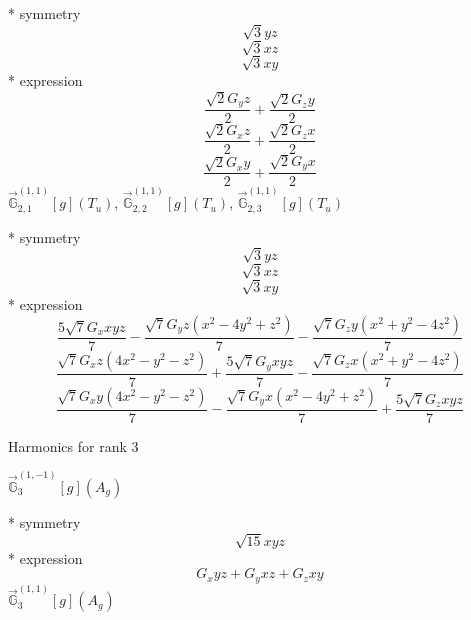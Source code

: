 \documentclass[fleqn,8pt]{jsarticle}
\begin{document}
\noindent\quad ** symmetry
\begin{dmath*}
\sqrt{3} y z
\end{dmath*}
\begin{dmath*}
\sqrt{3} x z
\end{dmath*}
\begin{dmath*}
\sqrt{3} x y
\end{dmath*}
\noindent\quad ** expression
\begin{dmath*}
\frac{\sqrt{2} G_{y} z}{2} + \frac{\sqrt{2} G_{z} y}{2}
\end{dmath*}
\begin{dmath*}
\frac{\sqrt{2} G_{x} z}{2} + \frac{\sqrt{2} G_{z} x}{2}
\end{dmath*}
\begin{dmath*}
\frac{\sqrt{2} G_{x} y}{2} + \frac{\sqrt{2} G_{y} x}{2}
\end{dmath*}
\noindent\quad $\vec{\mathbb{G}}_{2,1}^{(1,1)}[g](T_{u})$, $\vec{\mathbb{G}}_{2,2}^{(1,1)}[g](T_{u})$, $\vec{\mathbb{G}}_{2,3}^{(1,1)}[g](T_{u})$

\noindent\quad ** symmetry
\begin{dmath*}
\sqrt{3} y z
\end{dmath*}
\begin{dmath*}
\sqrt{3} x z
\end{dmath*}
\begin{dmath*}
\sqrt{3} x y
\end{dmath*}
\noindent\quad ** expression
\begin{dmath*}
\frac{5 \sqrt{7} G_{x} x y z}{7} - \frac{\sqrt{7} G_{y} z \left(x^{2} - 4 y^{2} + z^{2}\right)}{7} - \frac{\sqrt{7} G_{z} y \left(x^{2} + y^{2} - 4 z^{2}\right)}{7}
\end{dmath*}
\begin{dmath*}
\frac{\sqrt{7} G_{x} z \left(4 x^{2} - y^{2} - z^{2}\right)}{7} + \frac{5 \sqrt{7} G_{y} x y z}{7} - \frac{\sqrt{7} G_{z} x \left(x^{2} + y^{2} - 4 z^{2}\right)}{7}
\end{dmath*}
\begin{dmath*}
\frac{\sqrt{7} G_{x} y \left(4 x^{2} - y^{2} - z^{2}\right)}{7} - \frac{\sqrt{7} G_{y} x \left(x^{2} - 4 y^{2} + z^{2}\right)}{7} + \frac{5 \sqrt{7} G_{z} x y z}{7}
\end{dmath*}

\noindent * Harmonics for rank 3

\noindent\quad $\vec{\mathbb{G}}_{3}^{(1,-1)}[g](A_{g})$

\noindent\quad ** symmetry
\begin{dmath*}
\sqrt{15} x y z
\end{dmath*}
\noindent\quad ** expression
\begin{dmath*}
G_{x} y z + G_{y} x z + G_{z} x y
\end{dmath*}
\noindent\quad $\vec{\mathbb{G}}_{3}^{(1,1)}[g](A_{g})$
\end{document}
